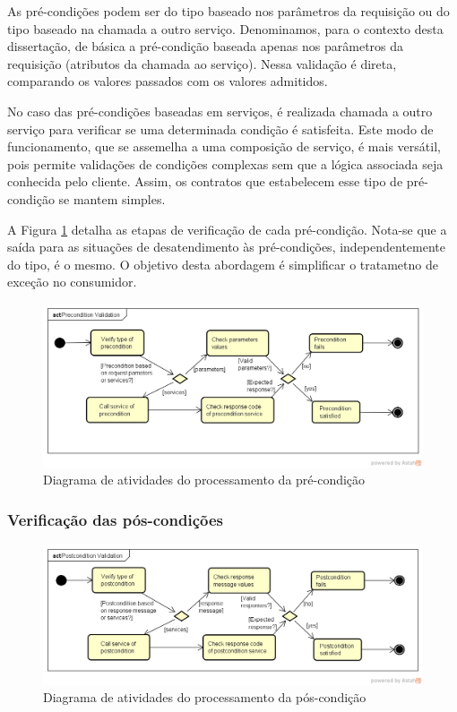 As pré-condições podem ser do tipo baseado nos parâmetros da requisição ou do
tipo baseado na chamada a outro serviço. Denominamos, para o contexto desta
dissertação, de básica a pré-condição baseada apenas nos parâmetros da
requisição (atributos da chamada ao serviço). Nessa validação é direta,
comparando os valores passados com os valores admitidos. 

No caso das pré-condições baseadas em serviços, é realizada chamada a outro
serviço para verificar se uma determinada condição é satisfeita. Este modo de
funcionamento, que se assemelha a uma composição de serviço, é mais versátil, pois permite
validações de condições complexas sem que a lógica associada seja conhecida pelo
cliente. Assim, os contratos que estabelecem esse tipo de
pré-condição se mantem simples.

A Figura \ref{FigServicePrecondition} detalha as etapas de verificação de cada
pré-condição. Nota-se que a saída para as situações de desatendimento às
pré-condições, independentemente do tipo, é o mesmo. O objetivo desta abordagem
é simplificar o tratametno de exceção no consumidor.

\begin{figure}[!htb]
\centering
\includegraphics[width=\textwidth,trim = 0mm 5mm 0mm 0mm,clip]{PreconditionValidation.png}
\caption{Diagrama de atividades do processamento da pré-condição}
\label{FigServicePrecondition}
\end{figure}


\subsubsection{Verificação das pós-condições}
\vspace{-6mm}

\begin{figure}[!htb]
\centering
\includegraphics[width=\textwidth,trim = 0mm 5mm 0mm
0mm,clip]{PostconditionValidation.png} 
\vspace{-6mm}
\caption{Diagrama de atividades do processamento da pós-condição}
\label{FigServicePostcondition}
\end{figure}

